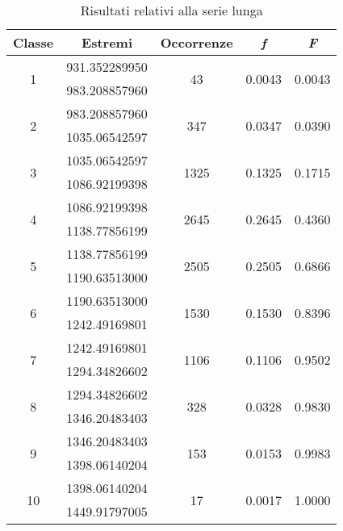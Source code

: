 \begin{table}[H]
	\centering
	\begin{tabular}{c|c|c|c|c}
		\toprule
		\toprule
		\textbf{Classe} & \textbf{Estremi} & \textbf{Occorrenze} & \textbf{\textit{f}} & \textbf{\textit{F}} \\
		\midrule
		\midrule
		\multirow{2}{*}{1} & 931.352289950& \multirow{2}{*}{43} & \multirow{2}{*}{0.0043} & \multirow{2}{*}{0.0043} \\
		& 983.208857960& & & \\
		\midrule
		\multirow{2}{*}{2} & 983.208857960 & \multirow{2}{*}{347} & \multirow{2}{*}{0.0347} & \multirow{2}{*}{0.0390} \\
		& 1035.06542597 & & & \\
		\midrule
		\multirow{2}{*}{3} &1035.06542597 & \multirow{2}{*}{1325} & \multirow{2}{*}{0.1325} & \multirow{2}{*}{0.1715} \\
		& 1086.92199398 & & & \\
		\midrule
		\multirow{2}{*}{4} & 1086.92199398 & \multirow{2}{*}{2645} & \multirow{2}{*}{0.2645} & \multirow{2}{*}{0.4360} \\
		& 1138.77856199 & & & \\
		\midrule
		\multirow{2}{*}{5} & 1138.77856199 & \multirow{2}{*}{2505} & \multirow{2}{*}{0.2505} & \multirow{2}{*}{0.6866} \\
		& 1190.63513000 & & & \\
		\midrule
		\multirow{2}{*}{6} & 1190.63513000 & \multirow{2}{*}{1530} & \multirow{2}{*}{0.1530} & \multirow{2}{*}{0.8396} \\
		& 1242.49169801 & & & \\
		\midrule
		\multirow{2}{*}{7} &1242.49169801 & \multirow{2}{*}{1106} & \multirow{2}{*}{0.1106} & \multirow{2}{*}{0.9502} \\
		& 1294.34826602 & & & \\
		\midrule
		\multirow{2}{*}{8} &1294.34826602 & \multirow{2}{*}{328} & \multirow{2}{*}{0.0328} & \multirow{2}{*}{0.9830} \\
		& 1346.20483403 & & & \\
		\midrule
		\multirow{2}{*}{9} &1346.20483403 & \multirow{2}{*}{153} & \multirow{2}{*}{0.0153} & \multirow{2}{*}{0.9983} \\
		&1398.06140204 & & & \\
		\midrule
		\multirow{2}{*}{10} &1398.06140204& \multirow{2}{*}{17} & \multirow{2}{*}{0.0017} & \multirow{2}{*}{1.0000} \\
		& 1449.91797005 & & & \\
		\bottomrule
		\bottomrule
	\end{tabular}
	\caption{Risultati relativi alla serie lunga}
	\label{tab:serielunga}
\end{table}
